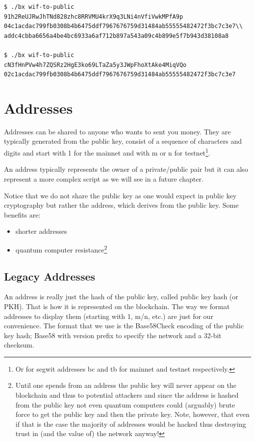 \begin{emphbox}
\begin{lstlisting}[style=Bash]
$ ./bx wif-to-public 91h2ReUJRwJhTNd828zhc8RRVMU4krX9q3LNi4nVfiVwkMPfA9p
04c1acdac799fb0308b4b6475ddf7967676759d31484ab55555482472f3bc7c3e7\\
addc4cbba6656a4be4bc6933a6af712b897a543a09c4b899e5f7b943d38108a8

$ ./bx wif-to-public cN3fHnPVw4h7ZQSRz2HgE3ko69LTaZa5y3JWpFhoXtAke4MiqVQo
02c1acdac799fb0308b4b6475ddf7967676759d31484ab55555482472f3bc7c3e7
\end{lstlisting}
\end{emphbox}


\section{Addresses}
Addresses can be shared to anyone who wants to sent you money. They are typically generated from the public key, consist of a sequence of characters and digits and start with 1 for the mainnet and with m or n for testnet\footnote{Or for segwit addresses bc and tb for mainnet and testnet respectively.}.

An address typically represents the owner of a private/public pair but it can also represent a more complex script as we will see in a future chapter.

Notice that we do not share the public key as one would expect in public key cryptography but rather the address, which derives from the public key. Some benefits are:

\begin{itemize}
\item shorter addresses
\item quantum computer resistance\footnote{Until one spends from an address the public key will never appear on the blockchain and thus to potential attackers and since the address is hashed from the public key not even quantum computers could (arguably) brute force to get the public key and then the private key. Note, however, that even if that is the case the majority of addresses would be hacked thus destroying trust in (and the value of) the network anyway!}
\end{itemize}


\subsection{Legacy Addresses}
An address is really just the hash of the public key, called public key hash (or PKH). That is how it is represented on the blockchain. The way we format addresses to display them (starting with 1, m/n, etc.) are just for our convenience. The format that we use is the Base58Check encoding of the public key hash; Base58 with version prefix to specify the network and a 32-bit checksum.

